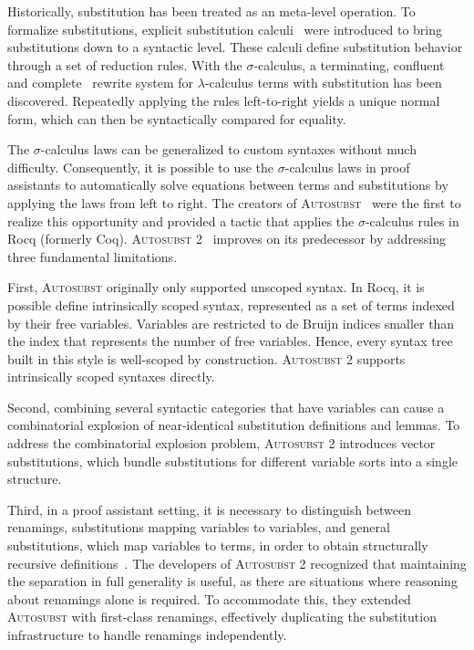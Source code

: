 \documentclass[screen,nonacm]{acmart}
\begin{document}
Historically, substitution has been treated as an meta-level operation. To
formalize substitutions, explicit substitution
calculi~\cite{10.1145/96709.96712} were introduced to bring substitutions down
to a syntactic level. These calculi define substitution behavior through a set
of reduction rules. With the $σ$-calculus, a terminating,
confluent~\cite{10.1145/226643.226675} and
complete~\cite{10.1145/2676724.2693163} rewrite system for $λ$-calculus terms
with substitution has been discovered. Repeatedly applying the rules
left-to-right yields a unique normal form, which can then be syntactically
compared for equality.

The $σ$-calculus laws can be generalized to custom syntaxes without much
difficulty. Consequently, it is possible to use the $σ$-calculus laws in proof
assistants to automatically solve equations between terms and substitutions by
applying the laws from left to right. The creators of
\textsc{Autosubst}~\cite{schafer2015autosubst} were the first to realize this
opportunity and provided a tactic that applies the $σ$-calculus rules in Rocq
(formerly Coq). \textsc{Autosubst 2}~\cite{10.1145/3293880.3294101} improves on
its predecessor by addressing three fundamental limitations.

First, \textsc{Autosubst} originally only supported unscoped syntax. In Rocq,
it is possible define intrinsically scoped syntax, represented as a set of
terms indexed by their free variables. Variables are restricted to de Bruijn
indices smaller than the index that represents the number of free variables.
Hence, every syntax tree built in this style is well-scoped by construction.
\textsc{Autosubst 2} supports intrinsically scoped syntaxes directly.

Second, combining several syntactic categories that have variables can cause a
combinatorial explosion of near-identical substitution definitions and lemmas.
To address the combinatorial explosion problem, \textsc{Autosubst 2} introduces
vector substitutions, which bundle substitutions for different variable sorts
into a single structure.

Third, in a proof assistant setting, it is necessary to distinguish between
renamings, substitutions mapping variables to variables, and general
substitutions, which map variables to terms, in order to obtain structurally
recursive definitions~\cite{10.1007/11617990_1}. The developers of
\textsc{Autosubst 2} recognized that maintaining the separation in full
generality is useful, as there are situations where reasoning about renamings
alone is required. To accommodate this, they extended \textsc{Autosubst} with
first-class renamings, effectively duplicating the substitution infrastructure
to handle renamings independently.
\end{document}
